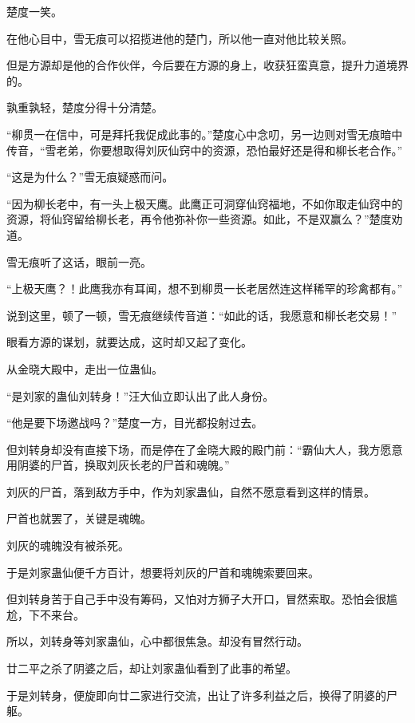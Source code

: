 
\begin{this_body}



楚度一笑。

在他心目中，雪无痕可以招揽进他的楚门，所以他一直对他比较关照。

但是方源却是他的合作伙伴，今后要在方源的身上，收获狂蛮真意，提升力道境界的。

孰重孰轻，楚度分得十分清楚。

“柳贯一在信中，可是拜托我促成此事的。”楚度心中念叨，另一边则对雪无痕暗中传音，“雪老弟，你要想取得刘灰仙窍中的资源，恐怕最好还是得和柳长老合作。”

“这是为什么？”雪无痕疑惑而问。

“因为柳长老中，有一头上极天鹰。此鹰正可洞穿仙窍福地，不如你取走仙窍中的资源，将仙窍留给柳长老，再令他弥补你一些资源。如此，不是双赢么？”楚度劝道。

雪无痕听了这话，眼前一亮。

“上极天鹰？！此鹰我亦有耳闻，想不到柳贯一长老居然连这样稀罕的珍禽都有。”

说到这里，顿了一顿，雪无痕继续传音道：“如此的话，我愿意和柳长老交易！”

眼看方源的谋划，就要达成，这时却又起了变化。

从金晓大殿中，走出一位蛊仙。

“是刘家的蛊仙刘转身！”汪大仙立即认出了此人身份。

“他是要下场邀战吗？”楚度一方，目光都投射过去。

但刘转身却没有直接下场，而是停在了金晓大殿的殿门前：“霸仙大人，我方愿意用阴婆的尸首，换取刘灰长老的尸首和魂魄。”

刘灰的尸首，落到敌方手中，作为刘家蛊仙，自然不愿意看到这样的情景。

尸首也就罢了，关键是魂魄。

刘灰的魂魄没有被杀死。

于是刘家蛊仙便千方百计，想要将刘灰的尸首和魂魄索要回来。

但刘转身苦于自己手中没有筹码，又怕对方狮子大开口，冒然索取。恐怕会很尴尬，下不来台。

所以，刘转身等刘家蛊仙，心中都很焦急。却没有冒然行动。

廿二平之杀了阴婆之后，却让刘家蛊仙看到了此事的希望。

于是刘转身，便旋即向廿二家进行交流，出让了许多利益之后，换得了阴婆的尸躯。


\end{this_body}
